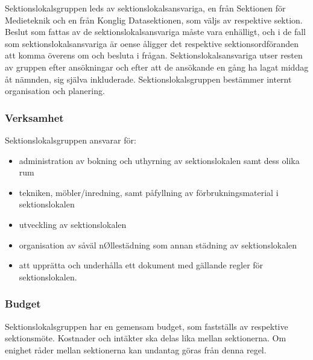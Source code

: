 \documentclass[a4paper,12pt]{article}
\begin{document}
Sektionslokalsgruppen leds av sektionslokalsansvariga, en från Sektionen för Medieteknik och en från Konglig Datasektionen, som väljs av respektive sektion. Beslut som fattas av de sektionslokalsansvariga måste vara enhälligt, och i de fall som sektionslokalsansvariga är oense åligger det respektive sektionsordföranden att komma överens
om och besluta i frågan. Sektionslokalsansvariga utser resten av gruppen efter ansökningar och efter att de ansökande en gång ha lagat middag åt nämnden, sig själva inkluderade. Sektionslokalsgruppen bestämmer internt organisation och planering.

\subsubsection{Verksamhet}

Sektionslokalsgruppen ansvarar för:

\begin{itemize}
  \item administration av bokning och uthyrning av sektionslokalen samt dess olika rum
\end{itemize}

\begin{itemize}
  \item tekniken, möbler/inredning, samt påfyllning av förbrukningsmaterial i sektionslokalen
\end{itemize}

\begin{itemize}
  \item utveckling av sektionslokalen
\end{itemize}

\begin{itemize}
  \item organisation av såväl nØllestädning som annan städning av sektionslokalen
\end{itemize}

\begin{itemize}
  \item att upprätta och underhålla ett dokument med gällande regler för sektionslokalen.
\end{itemize}

\subsubsection{Budget}

Sektionslokalsgruppen har en gemensam budget, som fastställs av respektive sektionsmöte. Kostnader och intäkter ska delas lika mellan sektionerna. Om enighet råder mellan sektionerna kan undantag göras från denna regel.
\end{document}
